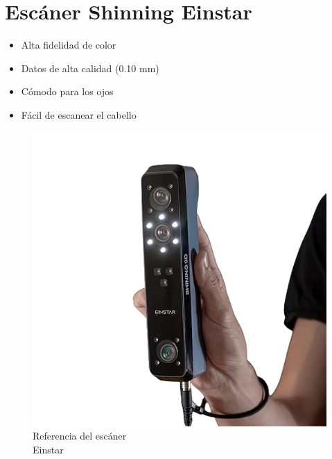 \documentclass[compacto,5pt,comentarios]{aleph-notas}
\begin{document}
\newpage
\section{Escáner Shinning Einstar} 

\begin{advertencia}
\begin{itemize}
    \item Alta fidelidad de color
    \item Datos de alta calidad (0.10 mm)
    \item Cómodo para los ojos
    \item Fácil de escanear el cabello
\end{itemize}
\end{advertencia}

\begin{figure}[H]
    \centering
    \begin{minipage}[t]{0.48\linewidth}
        \centering
        \includegraphics[width=\linewidth]{Logos/Einstar.jpg}
        \caption{Referencia del escáner \\ Einstar}
        \label{fig:imagen1}
    \end{minipage}%
    \hfill
    \begin{minipage}[t]{0.48\linewidth}
        \centering

\end{minipage}
\end{figure}
\end{document}
